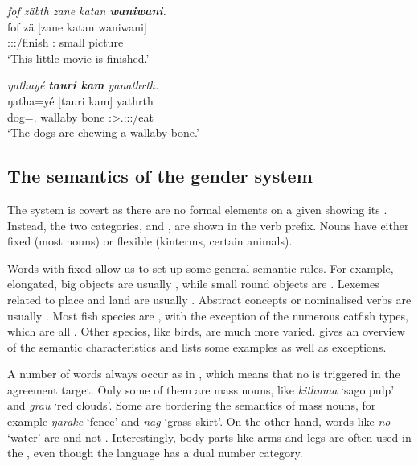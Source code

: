 \begin{exe}
	\ex \emph{fof zäbth zane katan \textbf{waniwani}.}\\
	\gll fof zä [zane katan waniwani]\\
	\Emph{} \Stsg:\Sbj:\Rpst:\Pfv/finish \Dem:\Prox{} small {picture}\\
	\trans `This little movie is finished.' 
	\label{ex046}
\end{exe}
\begin{exe}
	\ex \emph{ŋathayé \textbf{tauri kam} yanathrth.}\\
	\gll ŋatha=yé [tauri kam] yathrth\\
	dog=\Erg.\Nsg{} wallaby bone \Stpl:\Sbj>\Tsg.\Masc:\Obj:\Nonpast:\Ipfv/eat\\
	\trans `The dogs are chewing a wallaby bone.' 
	\label{ex047}
\end{exe}

\subsection{The semantics of the gender system}\label{wordclasses-thegendersystem}

The  system is covert as there are no formal elements on a given  showing its . Instead, the two categories,  and , are shown in the verb prefix. Nouns have either fixed  (most nouns) or flexible  (kinterms, certain animals).%

Words with fixed  allow us to set up some general semantic rules. For example, elongated, big objects are usually , while small round objects are . Lexemes related to place and land are usually . Abstract concepts or nominalised verbs are usually . Most fish species are , with the exception of the numerous catfish types, which are all . Other species, like birds, are much more varied.  gives an overview of the semantic characteristics and lists some examples as well as exceptions.%

A number of words always occur as in , which means that no  is triggered in the agreement target. Only some of them are mass nouns, like \emph{kithuma} `sago pulp' and \emph{grau} `red clouds'. Some are bordering the semantics of mass nouns, for example \emph{ŋarake} `fence' and \emph{nag} `grass skirt'. On the other hand, words like \emph{no} `water' are  and not . Interestingly, body parts like arms and legs are often used in the , even though the language has a dual number category.%


